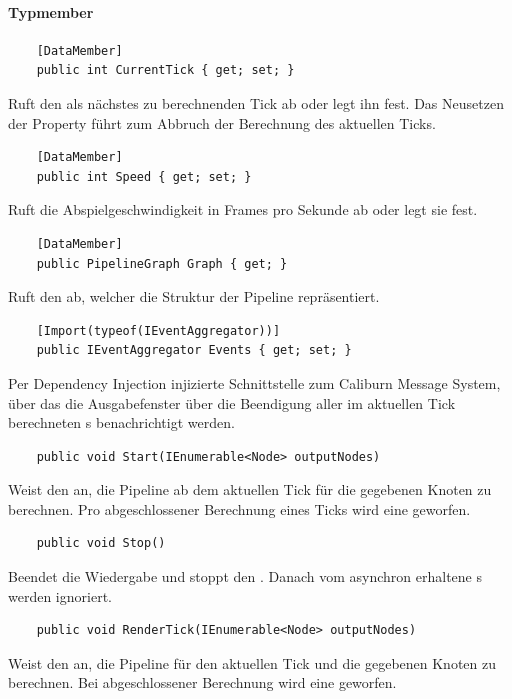 \paragraph{Typmember}
\begin{itemize}

	\begin{verbatim}
	[DataMember]
	public int CurrentTick { get; set; }
	\end{verbatim} 
	Ruft den als nächstes zu berechnenden Tick ab oder legt ihn fest. Das Neusetzen der Property führt zum Abbruch der Berechnung des aktuellen Ticks.

	\begin{verbatim}
	[DataMember]
	public int Speed { get; set; }
	\end{verbatim}
	Ruft die Abspielgeschwindigkeit in Frames pro Sekunde ab oder legt sie fest.

	\begin{verbatim}
	[DataMember]
	public PipelineGraph Graph { get; }
	\end{verbatim}
	Ruft den  ab, welcher die Struktur der Pipeline repräsentiert.

	\begin{verbatim}
	[Import(typeof(IEventAggregator))]
	public IEventAggregator Events { get; set; }
	\end{verbatim}
	Per Dependency Injection injizierte Schnittstelle zum Caliburn Message System, über das die Ausgabefenster über die Beendigung aller im aktuellen Tick berechneten s benachrichtigt werden.

	\begin{verbatim}
	public void Start(IEnumerable<Node> outputNodes)
	\end{verbatim}
	Weist den  an, die Pipeline ab dem aktuellen Tick für die gegebenen Knoten zu berechnen. Pro abgeschlossener Berechnung eines Ticks wird eine  geworfen.

	\begin{verbatim}
	public void Stop()
	\end{verbatim}
	Beendet die Wiedergabe und stoppt den . Danach vom  asynchron erhaltene s werden ignoriert.

	\begin{verbatim}
	public void RenderTick(IEnumerable<Node> outputNodes)
	\end{verbatim}
	Weist den  an, die Pipeline für den aktuellen Tick und die gegebenen Knoten zu berechnen. Bei abgeschlossener Berechnung wird eine  geworfen.
\end{itemize}

